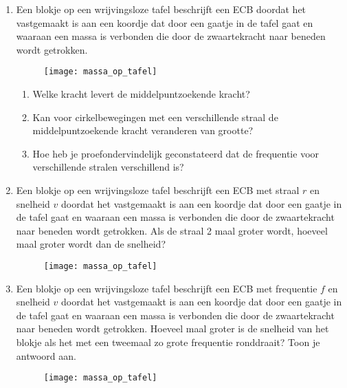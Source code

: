 \begin{enumerate}



\item Een blokje op een wrijvingsloze tafel beschrijft een ECB doordat het vastgemaakt is aan een koordje dat door een
gaatje in de tafel gaat en waaraan een massa is verbonden die door
de zwaartekracht naar beneden wordt getrokken.
\begin{figure}[h]
\begin{center}
\texttt{[image: massa\_op\_tafel]}
\end{center}
\end{figure}
\begin{enumerate}
\item Welke kracht levert de middelpuntzoekende kracht?
\item Kan voor cirkelbewegingen met een verschillende straal de
middelpuntzoekende kracht veranderen van grootte?
\item Hoe heb je proefondervindelijk geconstateerd dat de frequentie
voor verschillende stralen verschillend is?
\end{enumerate}

\item Een blokje op een wrijvingsloze tafel beschrijft een ECB met straal $r$ en snelheid $v$ doordat het vastgemaakt is aan een koordje dat door een gaatje in de tafel gaat en waaraan een massa is verbonden die door de zwaartekracht naar beneden wordt getrokken. Als de straal 2 maal groter wordt, hoeveel maal groter wordt dan de snelheid?
\begin{figure}[h]
\begin{center}
\texttt{[image: massa\_op\_tafel]}
\end{center}
\end{figure}

\item Een blokje op een wrijvingsloze tafel beschrijft een ECB met frequentie $f$ en snelheid $v$ doordat het
vastgemaakt is aan een koordje dat door een gaatje in de tafel gaat en waaraan een massa is verbonden die door de zwaartekracht naar beneden wordt getrokken. Hoeveel maal groter is de snelheid van het blokje als het met een tweemaal zo grote frequentie ronddraait? Toon je antwoord aan.
\begin{figure}[!h]
\begin{center}
\texttt{[image: massa\_op\_tafel]}
\end{center}
\end{figure}




\end{enumerate}
